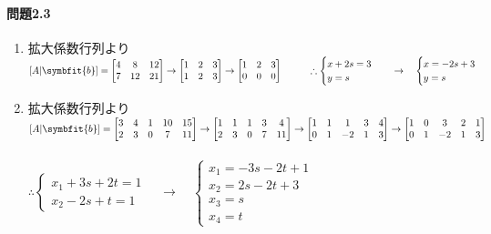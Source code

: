 \paragraph{問題2.3}
\begin{enumerate}[label=(\arabic*)]
    \item 拡大係数行列より\\
$[A|\symbfit{b}]=
\begin{bmatrix}
    4 & 8 & 12 \\
    7 & 12 & 21
\end{bmatrix}\rightarrow
\begin{bmatrix}
    1 & 2 & 3 \\
    1 & 2 & 3 \\
\end{bmatrix}\rightarrow
\begin{bmatrix}
    1 & 2 & 3 \\
    0 & 0 & 0
\end{bmatrix} \hspace{1cm}\therefore
\begin{cases}
    x+2s=3 \\
    y=s 
\end{cases}\quad \rightarrow \quad
\begin{cases}
    x = -2s+3\\
    y = s
\end{cases}$
\item 拡大係数行列より\\
$[A|\symbfit{b}]=
\begin{bmatrix}
    3 & 4 & 1 & 10 & 15 \\
    2 & 3 & 0 & 7 & 11
\end{bmatrix} \rightarrow
\begin{bmatrix}
    1 & 1 & 1 & 3 & 4 \\
    2 & 3 & 0 & 7 & 11
\end{bmatrix} \rightarrow
\begin{bmatrix}
    1 & 1 & 1 & 3 & 4 \\
    0 & 1 & -2 & 1 & 3 
\end{bmatrix}\rightarrow
\begin{bmatrix}
    1 & 0 & 3 & 2 & 1 \\
    0 & 1 & -2 & 1 & 3 
\end{bmatrix}$\\\\
\hspace{2cm}
$\therefore \begin{cases}
    x_1 +3s+2t=1 \\
    x_2 -2s+t=1
\end{cases}\quad \rightarrow \quad
\begin{cases}
    x_1 = -3s-2t+1 \\
    x_2 = 2s-2t+3 \\
    x_3 = s \\
    x_4 = t
\end{cases}$
\end{enumerate}

